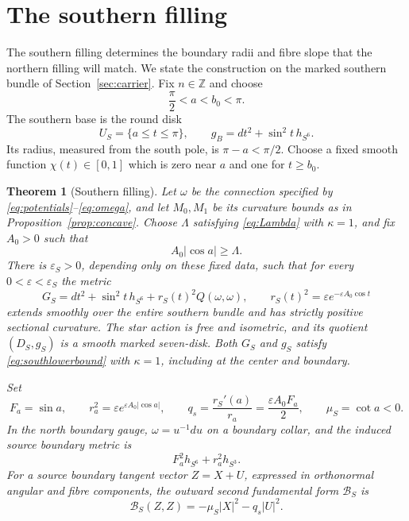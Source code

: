 \documentclass[12pt]{amsart}
\numberwithin{equation}{section}
\newtheorem{theorem}{Theorem}[section]
\theoremstyle{remark}
\newcommand{\eps}{\varepsilon}
\begin{document}
\section{The southern filling}\label{sec:south}

The southern filling determines the boundary radii and fibre slope
that the northern filling will match. We state the construction on
the marked southern bundle of Section~\ref{sec:carrier}.
Fix \(n\in\mathbb Z\) and choose
\[
\frac\pi2<a<b_0<\pi.
\]
The southern base is the round disk
\[
U_S=\{a\le t\le\pi\},\qquad
g_B=dt^2+\sin^2t\,h_{S^6}.
\]
Its radius, measured from the south pole, is \(\pi-a<\pi/2\).
Choose a fixed smooth function \(\chi(t)\in[0,1]\) which is zero
near \(a\) and one for \(t\ge b_0\).

\begin{theorem}[Southern filling]\label{thm:southfilling}
Let \(\omega\) be the connection specified by
\eqref{eq:potentials}--\eqref{eq:omega}, and let \(M_0,M_1\) be its
curvature bounds as in Proposition~\ref{prop:concave}.
Choose \(\Lambda\) satisfying \eqref{eq:Lambda} with \(\kappa=1\),
and fix \(A_0>0\) such that
\[
A_0|\cos a|\ge\Lambda.
\]
There is \(\eps_S>0\), depending only on these fixed data, such that
for every \(0<\eps<\eps_S\) the metric
\begin{equation}\label{eq:south}
G_S=dt^2+\sin^2t\,h_{S^6}+r_S(t)^2Q(\omega,\omega),
\qquad r_S(t)^2=\eps e^{-\eps A_0\cos t}
\end{equation}
extends smoothly over the entire southern bundle and has strictly
positive sectional curvature. The star action is free and isometric,
and its quotient \((D_S,g_S)\) is a smooth marked seven-disk. Both
\(G_S\) and \(g_S\) satisfy \eqref{eq:southlowerbound} with
\(\kappa=1\), including at the center and boundary.

Set
\begin{equation}\label{eq:boundarydata}
F_a=\sin a,\qquad
r_a^2=\eps e^{\eps A_0|\cos a|},\qquad
q_s=\frac{r_S'(a)}{r_a}=\frac{\eps A_0F_a}{2},
\qquad \mu_S=\cot a<0.
\end{equation}
In the north boundary gauge, \(\omega=u^{-1}du\) on a boundary
collar, and the induced source boundary metric is
\[
F_a^2h_{S^6}+r_a^2h_{S^3}.
\]
For a source boundary tangent vector \(Z=X+U\), expressed in
orthonormal angular and fibre components, the outward second
fundamental form \(\mathcal B_S\) is
\begin{equation}\label{eq:southsourceform}
 \mathcal B_S(Z,Z)=-\mu_S|X|^2-q_s|U|^2.
\end{equation}
\end{theorem}
\end{document}
